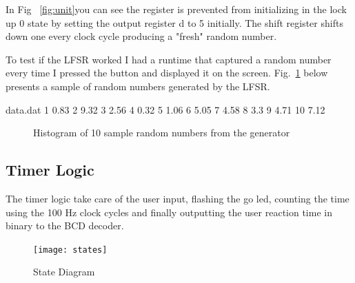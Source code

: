 \documentclass[paper=a4, fontsize=11pt]{scrartcl}
\numberwithin{equation}{section}		%
\numberwithin{figure}{section}			%
\numberwithin{table}{section}				%
\begin{document}
\begin{center}
In Fig ~\ref{fig:unit}you can see the register is prevented from initializing in the lock up 0 state by setting the output register d to 5 initially. The shift register shifts down one every clock cycle producing a "fresh" random number.

To test if the LFSR worked I had a runtime that captured a random number every time I pressed the button and displayed it on the screen. Fig.~\ref{fig:histr} below presents a sample of random numbers generated by the LFSR. 

\pgfplotsset{compat=1.10}
\newcommand{\plots}{0.611201}
\newcommand{\plotm}{2.19882}
\begin{filecontents}{data.dat}
1 0.83
2 9.32
3 2.56
4 0.32
5 1.06
6 5.05
7 4.58
8 3.3
9 4.71
10 7.12

\end{filecontents}
\begin{figure}[h!]
\centering
\caption{Histogram of 10 sample random numbers from the generator}

\label{fig:histr}
\end{figure}









\subsection{Timer Logic}

The timer logic take care of the user input, flashing the go led, counting the time using the 100 Hz clock cycles and finally outputting the user reaction time in binary to the BCD decoder.  


\begin{figure}[h!]
\centering
\caption{State Diagram}
\texttt{[image: states]}
\label{fig:states}
\end{figure}


\end{center}
\end{document}

